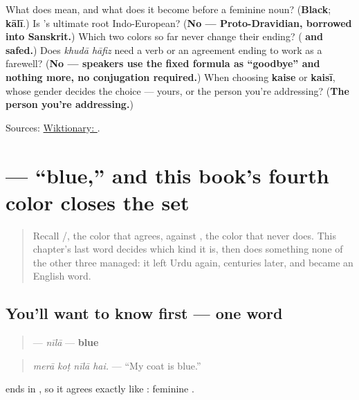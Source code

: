 \begin{tcolorbox}[breakable,colback=teal!4,colframe=teal!35!black,title={Before you move on}]
What does \textbf{} mean, and what does it become before a feminine noun? (\textbf{Black}; \textbf{kālī}.) Is \textbf{}'s ultimate root Indo-European? (\textbf{No — Proto-Dravidian, borrowed into Sanskrit.}) Which two colors so far never change their ending? (\textbf{ and safed.}) Does \emph{khudā hāfiz} need a verb or an agreement ending to work as a farewell? (\textbf{No — speakers use the fixed formula as \textquotedblleft{}goodbye\textquotedblright{} and nothing more, no conjugation required.}) When choosing \textbf{kaise} or \textbf{kaisī}, whose gender decides the choice — yours, or the person you're addressing? (\textbf{The person you're addressing.})

Sources: \href{https://en.wiktionary.org/wiki/\%DA\%A9\%D8\%A7\%D9\%84\%D8\%A7}{Wiktionary: }.
\end{tcolorbox}
\section[\texorpdfstring{\ur{نیلا} (nīlā)}{نیلا (nīlā)}]{ — \textquotedblleft{}blue,\textquotedblright{} and this book's fourth color closes the set}

\label{lesson:UR-C13-nila}



\begin{quote}
Recall \textbf{}/\textbf{}, the color that agrees, against \textbf{}, the color that never does. This chapter's last word decides which kind it is, then does something none of the other three managed: it left Urdu again, centuries later, and became an English word.
\end{quote}

\subsection*{You'll want to know first — one word}
\begin{quote}
\textbf{} — \emph{nīlā} — \textbf{blue}
\end{quote}

\begin{quote}
\emph{merā koṭ nīlā hai.} — \textquotedblleft{}My coat is blue.\textquotedblright{}
\end{quote}

\textbf{} ends in \textbf{}, so it agrees exactly like \textbf{}: feminine \textbf{}.

